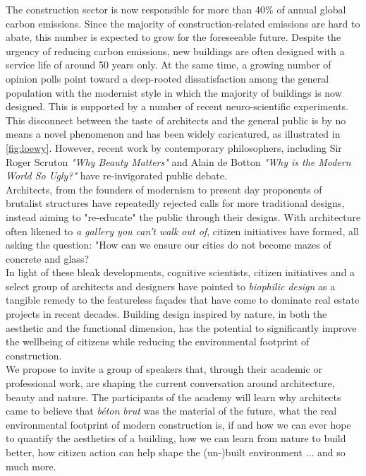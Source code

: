 \documentclass[a4paper]{article}
\begin{document}
The construction sector is now responsible for more than 40\% of annual global carbon emissions. Since the majority of construction-related emissions are hard to abate, this number is expected to grow for the foreseeable future. Despite the urgency of reducing carbon emissions, new buildings are often designed with a service life of around 50 years only. At the same time, a growing number of opinion polls point toward a deep-rooted dissatisfaction among the general population with the modernist style in which the majority of buildings is now designed. This is supported by a number of recent neuro-scientific experiments. \\

This disconnect between the taste of architects and the general public is by no means a novel phenomenon and has been widely caricatured, as illustrated in \cref{fig:loewy}. However, recent work by contemporary philosophers, including Sir Roger Scruton \textit{"Why Beauty Matters"} and Alain de Botton \textit{"Why is the Modern World So Ugly?"} have re-invigorated public debate. \\

Architects, from the founders of modernism to present day proponents of brutalist structures have repeatedly rejected calls for more traditional designs, instead aiming to "re-educate" the public through their designs. With architecture often likened to \textit{a gallery you can't walk out of}, citizen initiatives have formed, all asking the question: "How can we ensure our cities do not become mazes of concrete and glass? \\

In light of these bleak developments, cognitive scientists, citizen initiatives and a select group of architects and designers have pointed to \textit{biophilic design} as a tangible remedy to the featureless façades that have come to dominate real estate projects in recent decades. Building design inspired by nature, in both the aesthetic and the functional dimension, has the potential to significantly improve the wellbeing of citizens while reducing the environmental footprint of construction. \\

We propose to invite a group of speakers that, through their academic or professional work, are shaping the current conversation around architecture, beauty and nature. The participants of the academy will learn why architects came to believe that \textit{béton brut} was the material of the future, what the real environmental footprint of modern construction is, if and how we can ever hope to quantify the aesthetics of a building, how we can learn from nature to build better, how citizen action can help shape the (un-)built environment $\dots$ and so much more.
\end{document}
